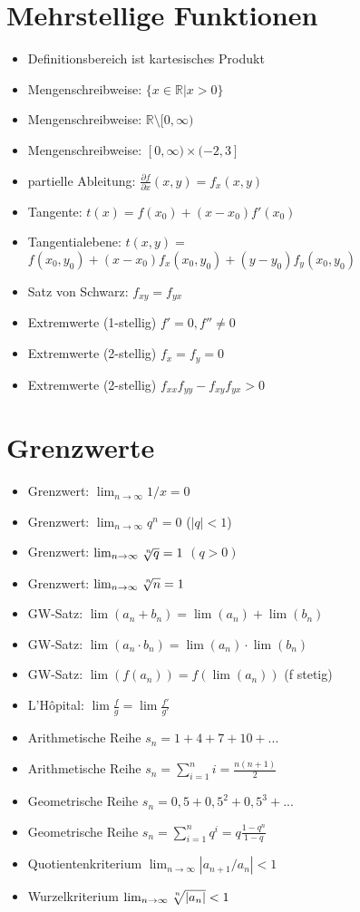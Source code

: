 \documentclass[a4paper,10pt]{article}
\begin{document}
\begin{multicols}{2}


\section {Mehrstellige Funktionen}
\begin{itemize}
\item Definitionsbereich ist kartesisches Produkt
\item Mengenschreibweise: $\{ x \in \mathbb{R} | x > 0\}$
\item Mengenschreibweise: $\mathbb{R}\setminus[0,\infty)$
\item Mengenschreibweise: $[0,\infty) \times (-2,3]$
\item partielle Ableitung: $\frac{\partial f}{\partial x}(x,y) = f_x(x,y)$
\item Tangente: $t(x) = f(x_0) + (x-x_0)f'(x_0)$
\item Tangentialebene: $t(x,y) = $ \\
$f(x_0,y_0) + (x-x_0)f_x(x_0,y_0) + (y-y_0)f_y(x_0,y_0)$
\item Satz von Schwarz: $f_{xy} = f_{yx}$
\item Extremwerte (1-stellig) $f' = 0, f'' \ne 0$
\item Extremwerte (2-stellig) $f_x = f_y = 0$
\item Extremwerte (2-stellig) $f_{xx} f_{yy} - f_{xy}f_{yx} > 0$
\end{itemize}

\section {Grenzwerte}
\begin{itemize}
\item Grenzwert: $\lim_{n \to \infty} 1/x = 0$
\item Grenzwert: $\lim_{n \to \infty} q^n = 0$ ($|q| < 1$)
\item Grenzwert: $\lim_{n \to \infty} \sqrt[\leftroot{-2}\uproot{2}n]{q} = 1$ $(q > 0)$
\item Grenzwert: $\lim_{n \to \infty} \sqrt[\leftroot{-2}\uproot{2}n]{n} = 1$
\item GW-Satz: $\lim (a_n+b_n) = \lim (a_n) + \lim (b_n)$
\item GW-Satz: $\lim (a_n\cdot b_n) = \lim(a_n) \cdot \lim(b_n)$
\item GW-Satz: $\lim (f(a_n)) = f(\lim(a_n))$ (f stetig)
\item L'Hôpital: $\lim \frac{f}{g} = \lim \frac{f'}{g'}$
\item Arithmetische Reihe $s_n = 1 + 4 + 7 + 10 + ...$
\item Arithmetische Reihe $s_n = \sum_{i=1}^n{i} = \frac{n(n+1)}{2}$
\item Geometrische Reihe $s_n = 0{,}5 + 0{,}5^2 + 0{,}5^3 + ...$
\item Geometrische Reihe $s_n = \sum_{i=1}^n q^i = q\frac{1-q^n}{1-q}$
\item Quotientenkriterium $\lim_{n\to\infty} |a_{n+1} / a_n| < 1$
\item Wurzelkriterium $\lim_{n\to\infty} \nroot{n}{|a_n|} < 1$
\end{itemize}


\end{multicols}
\end{document}
